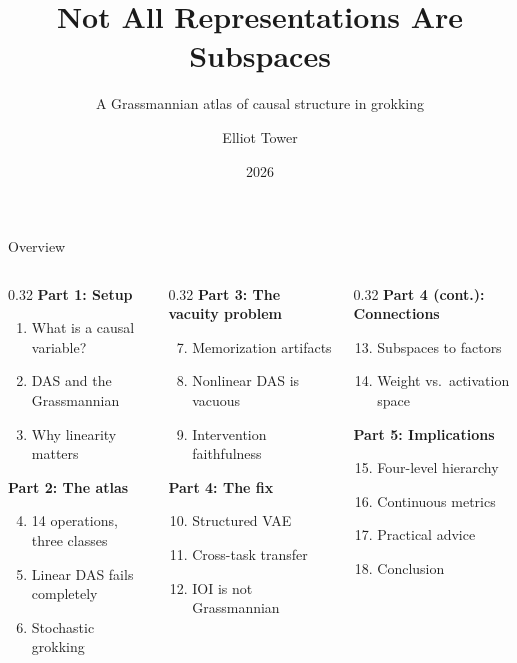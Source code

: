 \documentclass[aspectratio=169,11pt]{beamer}
\title{Not All Representations Are Subspaces}
\subtitle{A Grassmannian atlas of causal structure in grokking}
\author{Elliot Tower}
\date{2026}
\institute{}
\begin{document}
\maketitle

\begin{frame}{Overview}
\begin{columns}[T]
\begin{column}{0.32\textwidth}
\textbf{Part 1: Setup}
\begin{enumerate}
  \item What is a causal variable?
  \item DAS and the Grassmannian
  \item Why linearity matters
\end{enumerate}
\vspace{0.5em}
\textbf{Part 2: The atlas}
\begin{enumerate}
  \setcounter{enumi}{3}
  \item 14 operations, three classes
  \item Linear DAS fails completely
  \item Stochastic grokking
\end{enumerate}
\end{column}
\begin{column}{0.32\textwidth}
\textbf{Part 3: The vacuity problem}
\begin{enumerate}
  \setcounter{enumi}{6}
  \item Memorization artifacts
  \item Nonlinear DAS is vacuous
  \item Intervention faithfulness
\end{enumerate}
\vspace{0.5em}
\textbf{Part 4: The fix}
\begin{enumerate}
  \setcounter{enumi}{9}
  \item Structured VAE
  \item Cross-task transfer
  \item IOI is not Grassmannian
\end{enumerate}
\end{column}
\begin{column}{0.32\textwidth}
\textbf{Part 4 (cont.): Connections}
\begin{enumerate}
  \setcounter{enumi}{12}
  \item Subspaces to factors
  \item Weight vs.\ activation space
\end{enumerate}
\vspace{0.5em}
\textbf{Part 5: Implications}
\begin{enumerate}
  \setcounter{enumi}{14}
  \item Four-level hierarchy
  \item Continuous metrics
  \item Practical advice
  \item Conclusion
\end{enumerate}
\end{column}
\end{columns}
\end{frame}
\end{document}
